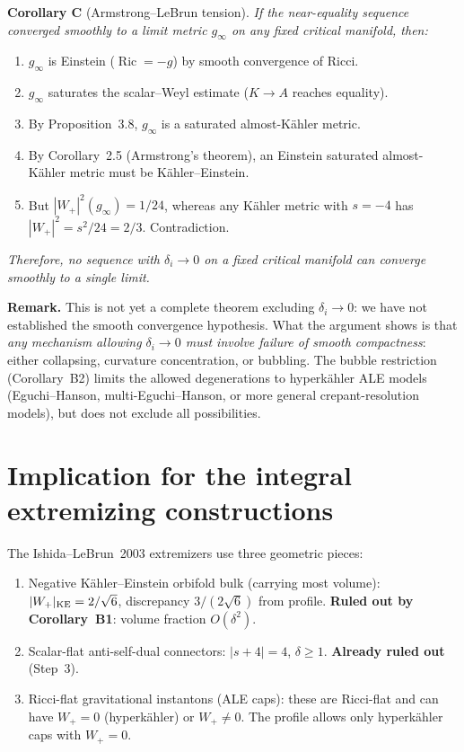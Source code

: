 \medskip
\noindent\textbf{Corollary C} (Armstrong--LeBrun tension).
\emph{If the near-equality sequence converged smoothly to a limit metric
\(g_\infty\) on any fixed critical manifold, then:}
\begin{enumerate}
\item \(g_\infty\) is Einstein (\(\operatorname{Ric}=-g\)) by smooth
  convergence of Ricci.
\item \(g_\infty\) saturates the scalar--Weyl estimate (\(K\to A\)
  reaches equality).
\item By Proposition~3.8, \(g_\infty\) is a saturated almost-K\"ahler metric.
\item By Corollary~2.5 (Armstrong's theorem),
  an Einstein saturated almost-K\"ahler metric must be K\"ahler--Einstein.
\item But \(|W_+|^2(g_\infty)=1/24\), whereas any K\"ahler metric with
  \(s=-4\) has \(|W_+|^2=s^2/24=2/3\).  Contradiction.
\end{enumerate}
\emph{Therefore, no sequence with \(\delta_i\to0\) on a fixed critical manifold
can converge smoothly to a single limit.}

\noindent\textbf{Remark.}  This is not yet a complete theorem excluding
\(\delta_i\to0\): we have not established the smooth convergence
hypothesis.  What the argument shows is that \emph{any mechanism allowing
\(\delta_i\to0\) must involve failure of smooth compactness}: either
collapsing, curvature concentration, or bubbling.  The bubble restriction
(Corollary~B2) limits the allowed degenerations to hyperk\"ahler ALE models
(Eguchi--Hanson, multi-Eguchi--Hanson, or more general crepant-resolution
models), but does not exclude all possibilities.

\section{Implication for the integral extremizing constructions}

The Ishida--LeBrun~2003 extremizers use three geometric pieces:
\begin{enumerate}
\item Negative K\"ahler--Einstein orbifold bulk (carrying most volume):
  \(|W_+|_{\rm KE}=2/\sqrt6\), discrepancy \(3/(2\sqrt6)\) from profile.
  \textbf{Ruled out by Corollary~B1}: volume fraction \(O(\delta^2)\).
\item Scalar-flat anti-self-dual connectors:
  \(|s+4|=4\), \(\delta\ge1\).
  \textbf{Already ruled out} (Step~3).
\item Ricci-flat gravitational instantons (ALE caps):
  these are Ricci-flat and can have \(W_+=0\)
  (hyperk\"ahler) or \(W_+\ne0\).  The profile allows
  only hyperk\"ahler caps with \(W_+=0\).
\end{enumerate}

